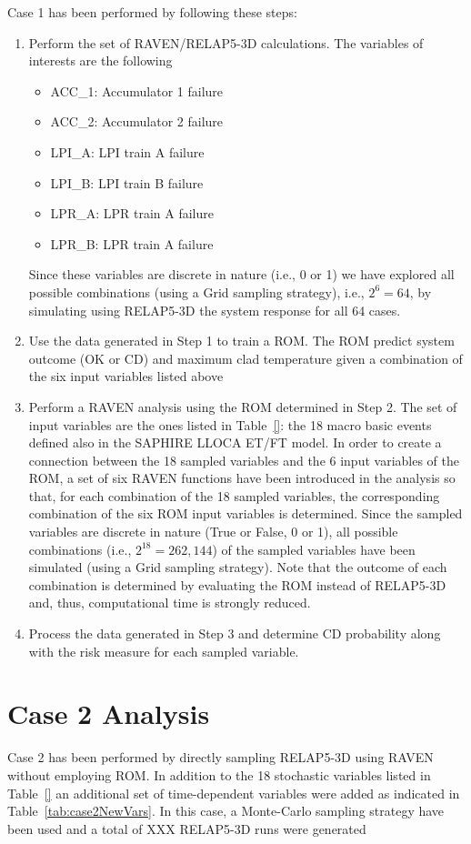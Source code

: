 Case 1 has been performed by following these steps:
\begin{enumerate}
	\item Perform the set of RAVEN/RELAP5-3D calculations. The variables of interests
	      are the following 
	      \begin{itemize}
	      	\item ACC\_1: Accumulator 1 failure
	      	\item ACC\_2: Accumulator 2 failure
	      	\item LPI\_A: LPI train A failure
	      	\item LPI\_B: LPI train B failure
	      	\item LPR\_A: LPR train A failure
	      	\item LPR\_B: LPR train A failure
	      \end{itemize}
	      Since these variables are discrete in nature (i.e., 0 or 1) we have explored all
	      possible combinations (using a Grid sampling strategy), i.e., $2^6=64$, 
	      by simulating using RELAP5-3D the system response for all 64 cases.
	\item Use the data generated in Step 1 to train a ROM. The ROM predict system outcome
	      (OK or CD) and maximum clad temperature given a combination of the six input 
	      variables listed above
	\item Perform a RAVEN analysis using the ROM determined in Step 2. The set of input 
	      variables are the ones listed in Table~\ref{}: the 18 macro basic events defined also 
	      in the SAPHIRE LLOCA ET/FT model. 
	      In order to create a connection between the 18 sampled variables and the 6 input 
	      variables of the ROM, a set of six RAVEN functions have been introduced in the analysis
	      so that, for each combination of the 18 sampled variables, the corresponding combination
	      of the six ROM input variables is determined.
	      Since the sampled variables are discrete in nature (True or False, 0 or 1), all possible
	      combinations (i.e., $2^18=262,144$) of the sampled variables have been simulated 
	      (using a Grid sampling strategy).
	      Note that the outcome of each combination is determined by evaluating the ROM instead 
	      of RELAP5-3D and, thus, computational time is strongly reduced. 
	\item Process the data generated in Step 3 and determine CD probability along with the risk
	      measure for each sampled variable.
\end{enumerate}

\section{Case 2 Analysis}
\label{sec:RISMC_2_analysis}

Case 2 has been performed by directly sampling RELAP5-3D using RAVEN without employing ROM. 
In addition to the 18 stochastic variables listed in Table~\ref{} an additional set of time-dependent
variables were added as indicated in Table~\ref{tab:case2NewVars}.
In this case, a Monte-Carlo sampling strategy have been used and a total of XXX RELAP5-3D runs were 
generated



